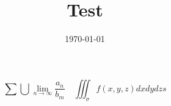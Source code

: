 \documentclass{book}
\author{\aleph}
\date{\today}
\title{Test}
\begin{document}
    \chapter{}
    \begin{equation*}
        \sum\bigcup\lim_{n \to \infty}\frac{a_n}{b_m}\quad \iiint_{\sigma}f(x,y,z)dxdydzs
    \end{equation*}
\end{document}
